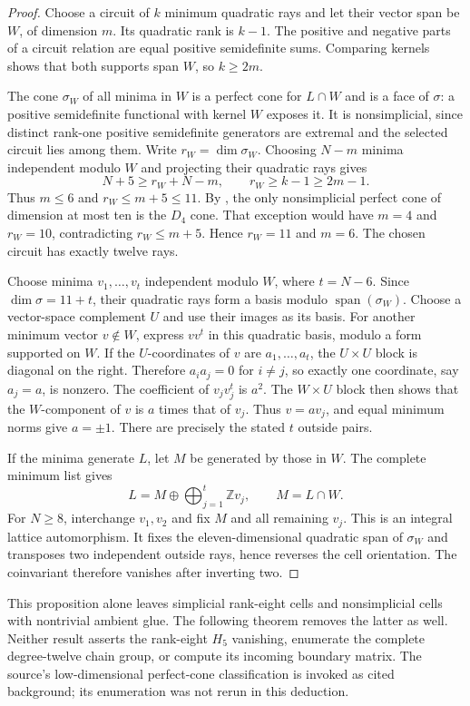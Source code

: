 \documentclass[11pt,a4paper]{article}
\theoremstyle{definition}
\begin{document}
\begin{proof}
Choose a circuit of $k$ minimum quadratic rays and let their vector
span be $W$, of dimension $m$. Its quadratic rank is $k-1$.
The positive and negative parts of a circuit relation are equal
positive semidefinite sums. Comparing kernels shows that both
supports span $W$, so $k\geq2m$.

The cone $\sigma_W$ of all minima in $W$ is a perfect cone for
$L\cap W$ and is a face of $\sigma$: a positive semidefinite
functional with kernel $W$ exposes it. It is nonsimplicial, since
distinct rank-one positive semidefinite generators are extremal and
the selected circuit lies among them. Write $r_W=\dim\sigma_W$.
Choosing $N-m$ minima independent modulo $W$ and projecting their
quadratic rays gives
\[
 N+5\geq r_W+N-m,
 \qquad r_W\geq k-1\geq2m-1.
\]
Thus $m\leq6$ and $r_W\leq m+5\leq11$.
By \cite[Theorem~1.1(ii)]{DutourHulekSchurmann2015}, the only
nonsimplicial perfect cone of dimension at most ten is the $D_4$
cone. That exception would have $m=4$ and $r_W=10$, contradicting
$r_W\leq m+5$. Hence $r_W=11$ and $m=6$. The chosen circuit has
exactly twelve rays.

Choose minima $v_1,\ldots,v_t$ independent modulo $W$, where
$t=N-6$. Since $\dim\sigma=11+t$, their quadratic rays form a
basis modulo $\operatorname{span}(\sigma_W)$. Choose a vector-space
complement $U$ and use their images as its basis. For another
minimum vector $v\notin W$, express $vv^t$ in this quadratic basis,
modulo a form supported on $W$. If the $U$-coordinates of $v$ are
$a_1,\ldots,a_t$, the $U\times U$ block is diagonal on the right.
Therefore $a_i a_j=0$ for $i\ne j$, so exactly one coordinate,
say $a_j=a$, is nonzero. The coefficient of $v_jv_j^t$ is $a^2$.
The $W\times U$ block then shows that the $W$-component of $v$
is $a$ times that of $v_j$. Thus $v=av_j$, and equal minimum norms
give $a=\pm1$. There are precisely the stated $t$ outside pairs.

If the minima generate $L$, let $M$ be generated by those in $W$.
The complete minimum list gives
\[
 L=M\oplus\bigoplus_{j=1}^t\mathbb Zv_j,
 \qquad M=L\cap W.
\]
For $N\geq8$, interchange $v_1,v_2$ and fix $M$ and all remaining
$v_j$. This is an integral lattice automorphism. It fixes the
eleven-dimensional quadratic span of $\sigma_W$ and transposes
two independent outside rays, hence reverses the cell orientation.
The coinvariant therefore vanishes after inverting two.
\end{proof}

This proposition alone leaves simplicial rank-eight cells and nonsimplicial
cells with nontrivial ambient glue. The following theorem removes the
latter as well. Neither result asserts the rank-eight
$H_5$ vanishing, enumerate the complete degree-twelve chain group,
or compute its incoming boundary matrix. The source's low-dimensional
perfect-cone classification is invoked as cited background; its
enumeration was not rerun in this deduction.
\end{document}
